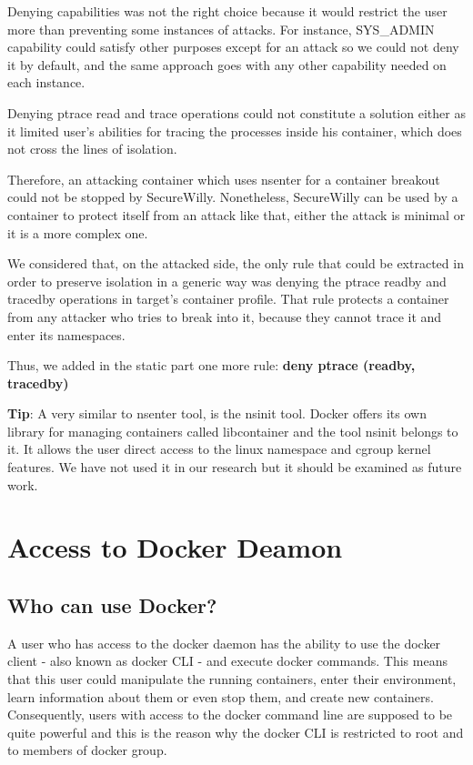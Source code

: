 Denying capabilities was not the right choice because it would restrict the user more than preventing some instances of attacks. For instance, SYS\_ADMIN capability could satisfy other purposes except for an attack so we could not deny it by default, and the same approach goes with any other capability needed on each instance.

Denying ptrace read and trace operations could not constitute a solution either as it limited user's abilities for tracing the processes inside his container, which does not cross the lines of isolation.

Therefore, an attacking container which uses nsenter for a container breakout could not be stopped by SecureWilly. Nonetheless, SecureWilly can be used by a container to protect itself from an attack like that, either the attack is minimal or it is a more complex one.

We considered that, on the attacked side, the only rule that could be extracted in order to preserve isolation in a generic way was denying the ptrace readby and tracedby operations in target's container profile. That rule protects a container from any attacker who tries to break into it, because they cannot trace it and enter its namespaces.
 
Thus, we added in the static part one more rule: \textbf{deny ptrace (readby, tracedby)}

\begin{mdframed}[backgroundcolor=tipcolor]
\textbf{Tip}: A very similar to nsenter tool, is the nsinit tool. Docker offers its own library for managing containers called libcontainer and the tool nsinit belongs to it. It allows the user direct access to the linux namespace and cgroup kernel features. We have not used it in our research but it should be examined as future work.
\end{mdframed}

\section{Access to Docker Deamon}
\subsection{Who can use Docker?}
A user who has access to the docker daemon has the ability to use the docker client - also known as docker CLI - and execute docker commands. This means that this user could manipulate the running containers, enter their environment, learn information about them or even stop them, and create new containers. Consequently, users with access to the docker command line are supposed to be quite powerful and this is the reason why the docker CLI is restricted to root and to members of docker group.


